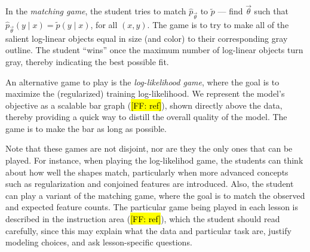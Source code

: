 \documentclass[11pt,letterpaper]{article}
\newcommand{\Note}[1]{}
\renewcommand{\Note}[1]{\hl{[#1]}}
\newcommand{\NoteSigned}[3]{{\sethlcolor{#2}\Note{#1: #3}}}
\newcommand{\NoteFF}[1]{\NoteSigned{FF}{LightBlue}{#1}}
\begin{document}
In the \textit{matching game}, the student tries to match $\hat{p}_{\vec{\theta}}$ to 
$\tilde{p}$ --- find $\vec{\theta}$ such that $\hat{p}_{\vec{\theta}}(y\mid x) 
= \tilde{p}(y\mid x)$, for all $(x,y)$. The game is to try to make all of the salient log-linear objects 
equal in size (and color) to their corresponding gray outline. The student ``wins'' once the maximum
number of log-linear objects turn gray, thereby indicating the best possible fit.

An alternative game to play is the \textit{log-likelihood game}, where the goal is to
maximize the (regularized) training log-likelihood. We represent the model's objective as a scalable 
bar graph (\NoteFF{ref}), shown directly above the data, thereby providing a quick way to distill 
the overall quality of the model. The game is to make the bar as long as possible.

Note that these games are not disjoint, nor are they the only ones that can be played.
For instance, when playing the log-likelihod game, the students can think about how well 
the shapes match, particularly when more advanced concepts such as regularization and conjoined features are 
introduced. Also, the student can play a variant of the matching game, where the goal
is to match the observed and expected feature counts. The particular game being played
in each lesson is described in the instruction area (\NoteFF{ref}), which the student should
read carefully, since this may explain what the data and particular task are, justify 
modeling choices, and ask lesson-specific questions. 


\end{document}
